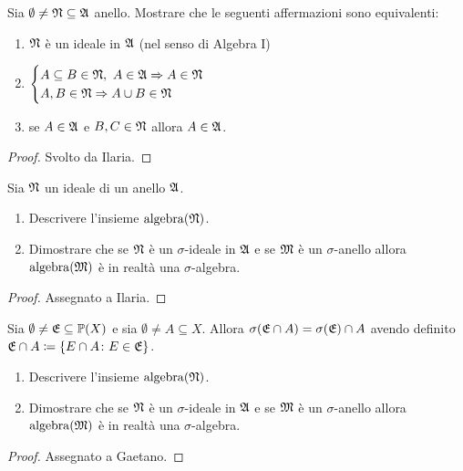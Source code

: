 \documentclass[../EserciziIstituzioniAnalisi.tex]{subfiles}
\begin{document}
\begin{exercise}[2016-10-13]
  Sia $\emptyset \neq \mathfrak N \subseteq \mathfrak A$ anello.
  Mostrare che le seguenti affermazioni sono equivalenti:
  \begin{enumerate}
  \item $\mathfrak N$ \`e un ideale in $\mathfrak A$ (nel senso di Algebra I)    
  \item $\displaystyle
    \begin{cases}
      A \subseteq B \in \mathfrak N,\ A \in \mathfrak A \Rightarrow A \in \mathfrak N \\
      A, B \in \mathfrak N \Rightarrow A \cup B \in \mathfrak N
    \end{cases}$
  \item se $A \in \mathfrak A$ e $B, C \in \mathfrak N$ allora $A \in \mathfrak A$.
  \end{enumerate}
\end{exercise}
\begin{proof}
  Svolto da Ilaria.  
\end{proof}

\begin{exercise}[13/10/2016]
Sia $\mathfrak N$ un ideale di un anello $\mathfrak A$.
\begin{enumerate}
\item Descrivere l'insieme $\operatorname{algebra}(\mathfrak N)$.
\item Dimostrare che se $\mathfrak N$ è un $\sigma$-ideale in $\mathfrak A$ e se $\mathfrak M$ è un $\sigma$-anello allora $\operatorname{algebra}(\mathfrak M)$ è in realtà una $\sigma$-algebra.
\end{enumerate}
\end{exercise}
\begin{proof}
  Assegnato a Ilaria.
\end{proof}

\begin{exercise}[2016-10-13]
Sia $\emptyset \neq \mathfrak E \subseteq \mathbb P(X)$ e sia $\emptyset \neq A \subseteq X$.
Allora $\sigma(\mathfrak E \cap A) = \sigma(\mathfrak E) \cap A$ avendo definito $\mathfrak E \cap A \coloneqq \left\lbrace E \cap A \colon E \in \mathfrak E\right\rbrace$.
\begin{enumerate}
\item Descrivere l'insieme $\operatorname{algebra}(\mathfrak N)$.
\item Dimostrare che se $\mathfrak N$ è un $\sigma$-ideale in $\mathfrak A$ e se $\mathfrak M$ è un $\sigma$-anello allora $\operatorname{algebra}(\mathfrak M)$ è in realtà una $\sigma$-algebra.
\end{enumerate}
\end{exercise}
\begin{proof}
Assegnato a Gaetano.
\end{proof}
\end{document}
